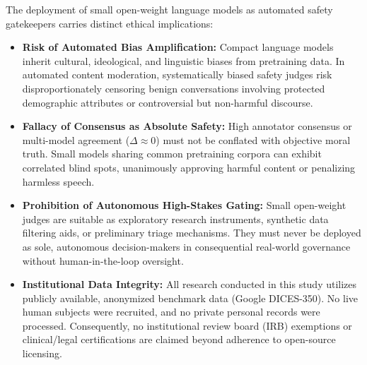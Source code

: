 The deployment of small open-weight language models as automated safety gatekeepers carries distinct ethical implications:
\begin{itemize}
    \item \textbf{Risk of Automated Bias Amplification:} Compact language models inherit cultural, ideological, and linguistic biases from pretraining data. In automated content moderation, systematically biased safety judges risk disproportionately censoring benign conversations involving protected demographic attributes or controversial but non-harmful discourse.
    \item \textbf{Fallacy of Consensus as Absolute Safety:} High annotator consensus or multi-model agreement ($\Delta \approx 0$) must not be conflated with objective moral truth. Small models sharing common pretraining corpora can exhibit correlated blind spots, unanimously approving harmful content or penalizing harmless speech.
    \item \textbf{Prohibition of Autonomous High-Stakes Gating:} Small open-weight judges are suitable as exploratory research instruments, synthetic data filtering aids, or preliminary triage mechanisms. They must never be deployed as sole, autonomous decision-makers in consequential real-world governance without human-in-the-loop oversight.
    \item \textbf{Institutional Data Integrity:} All research conducted in this study utilizes publicly available, anonymized benchmark data (Google DICES-350). No live human subjects were recruited, and no private personal records were processed. Consequently, no institutional review board (IRB) exemptions or clinical/legal certifications are claimed beyond adherence to open-source licensing.
\end{itemize}
